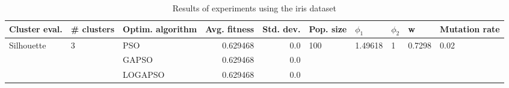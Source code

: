 \begin{table}
\centering
\caption{Results of experiments using the iris dataset}
\begin{tabular}{lllrrlllll}
\toprule
              Cluster eval. &        \# clusters & Optim. algorithm &  Avg. fitness &  Std. dev. &            Pop. size &               $\phi_{1}$ &         $\phi_{2}$ &                       w &         Mutation rate \\
\midrule
\multirow{3}{*}{Silhouette} & \multirow{3}{*}{3} &              PSO &      0.629468 &        0.0 & \multirow{3}{*}{100} & \multirow{3}{*}{1.49618} & \multirow{3}{*}{1} & \multirow{3}{*}{0.7298} & \multirow{3}{*}{0.02} \\
                            &                    &            GAPSO &      0.629468 &        0.0 &                      &                          &                    &                         &                       \\
                            &                    &          LOGAPSO &      0.629468 &        0.0 &                      &                          &                    &                         &                       \\
\bottomrule
\end{tabular}
\end{table}
